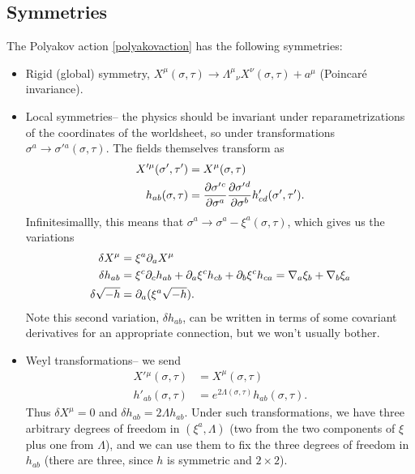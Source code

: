 \subsection*{Symmetries} The Polyakov action \ref{polyakovaction} has the following symmetries:
\begin{itemize}
    \item Rigid (global) symmetry, $X^\mu(\sigma,\tau)\to \Lambda^\mu{}_\nu X^\nu(\sigma,\tau) + a^\mu$ (Poincar\'e invariance).
    \item Local symmetries-- the physics should be invariant under reparametrizations of the coordinates of the worldsheet, so under transformations $\sigma^a \to \sigma'{}^a (\sigma,\tau).$ The fields themselves transform as
    \begin{align*}
        X'^\mu(\sigma',\tau')&= X^\mu(\sigma,\tau)\\
        h_{ab}(\sigma,\tau)&= \P{\sigma'{}^c}{\sigma^a} \P{\sigma'{}^d}{\sigma^b} h'_{cd}(\sigma',\tau').
    \end{align*}
    Infinitesimallly, this means that $\sigma^a \to \sigma^a - \xi^a(\sigma,\tau)$, which gives us the variations
    \begin{align*}
        \delta X^\mu &= \xi^a \p_a X^\mu\\
        \delta h_{ab} &= \xi^c \p_c h_{ab}+\p_a \xi^c h_{cb} +\p_b \xi^c h_{ca} =\nabla_a \xi_b +\nabla_b \xi_a\\
        \delta \sqrt{-h} &=\p_a(\xi^a \sqrt{-h}).
    \end{align*}
    Note this second variation, $\delta h_{ab}$, can be written in terms of some covariant derivatives for an appropriate connection, but we won't usually bother.
    \item Weyl transformations-- we send
    \begin{align*}
        X'{}^\mu (\sigma,\tau) &= X^\mu(\sigma, \tau)\\
        h'_{ab}(\sigma,\tau)&=e^{2\Lambda(\sigma,\tau)}h_{ab}(\sigma,\tau).
    \end{align*}
    Thus $\delta X^\mu=0$ and $\delta h_{ab}=2\Lambda h_{ab}$.
    Under such transformations, we have three arbitrary degrees of freedom in $(\xi^a,\Lambda)$ (two from the two components of $\xi$ plus one from $\Lambda$), and we can use them to fix the three degrees of freedom in $h_{ab}$ (there are three, since $h$ is symmetric and $2\times 2$).
\end{itemize}

